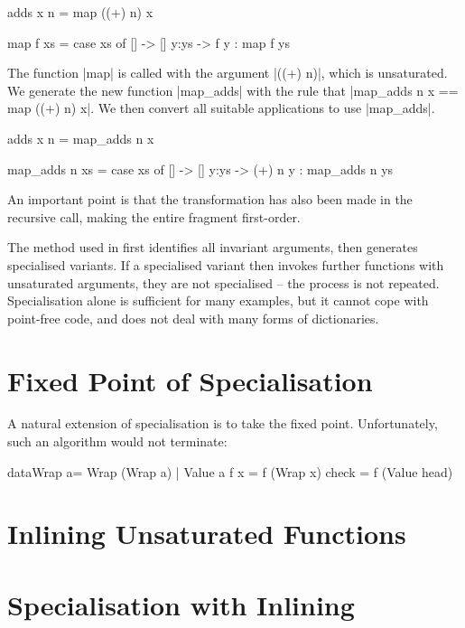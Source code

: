 \begin{example}
\begin{code}
adds x n = map ((+) n) x

map f xs = case  xs of
                 []    -> []
                 y:ys  -> f y : map f ys
\end{code}

\noindent The function |map| is called with the argument |((+) n)|, which is unsaturated. We generate the new function |map_adds| with the rule that |map_adds n x == map ((+) n) x|. We then convert all suitable applications to use |map_adds|.

\begin{code}
adds x n = map_adds n x

map_adds n xs = case  xs of
                      []    -> []
                      y:ys  -> (+) n y : map_adds n ys
\end{code}

An important point is that the transformation has also been made in the recursive call, making the entire fragment first-order.
\end{example}

The method used in \cite{me:catch_tfp} first identifies all invariant arguments, then generates specialised variants. If a specialised variant then invokes further functions with unsaturated arguments, they are not specialised -- the process is not repeated. Specialisation alone is sufficient for many examples, but it cannot cope with point-free code, and does not deal with many forms of dictionaries.

\section{Fixed Point of Specialisation}

A natural extension of specialisation is to take the fixed point. Unfortunately, such an algorithm would not terminate:

\begin{code}
dataWrap a= Wrap (Wrap a) | Value a
f x = f (Wrap x)
check = f (Value head)
\end{code}

\section{Inlining Unsaturated Functions}

\section{Specialisation with Inlining}



